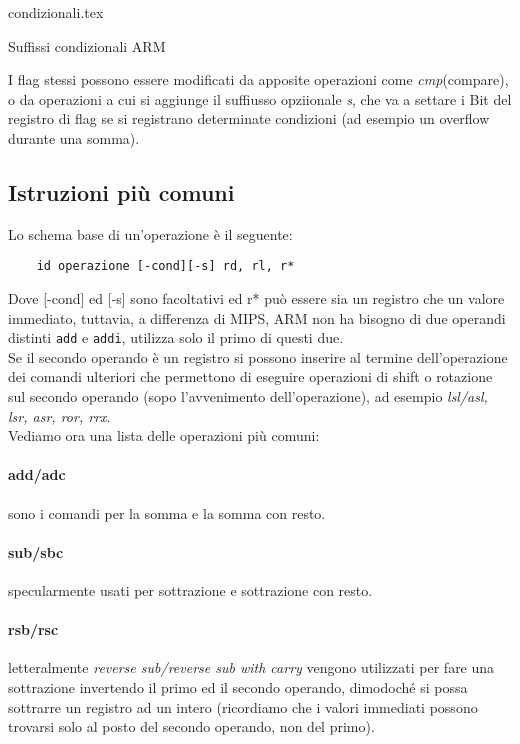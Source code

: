 \documentclass[class=book, crop=false]{standalone}
\begin{document}
\begin{table}[H]
	\centering
	{condizionali.tex}
	\caption*{Suffissi condizionali ARM}
\end{table}

I flag stessi possono essere modificati da apposite operazioni come \emph{cmp}(compare), o da operazioni a cui si aggiunge il suffiusso opziionale \emph{s}, che va a settare i Bit del registro di flag se si registrano determinate condizioni (ad esempio un overflow durante una somma).\\

\subsection*{Istruzioni più comuni}
Lo schema base di un'operazione è il seguente:

\begin{verbatim}
	id operazione [-cond][-s] rd, rl, r*
\end{verbatim}

Dove [-cond] ed [-s] sono facoltativi ed r* può essere sia un registro che un valore immediato, tuttavia, a differenza di MIPS, ARM non ha bisogno di due operandi distinti \texttt{add} e \texttt{addi}, utilizza solo il primo di questi due.\\
Se il secondo operando è un registro si possono inserire al termine dell'operazione dei comandi ulteriori che permettono di eseguire operazioni di shift o rotazione sul secondo operando (sopo l'avvenimento dell'operazione), ad esempio \emph{lsl/asl, lsr, asr, ror, rrx}.\\
Vediamo ora una lista delle operazioni più comuni:
\paragraph*{add/adc} sono i comandi per la somma e la somma con resto.
\paragraph{sub/sbc} specularmente usati per sottrazione e sottrazione con resto.
\paragraph*{rsb/rsc} letteralmente \emph{reverse sub/reverse sub with carry} vengono utilizzati per fare una sottrazione invertendo il primo ed il secondo operando, dimodoché si possa sottrarre un registro ad un intero (ricordiamo che i valori immediati possono trovarsi solo al posto del secondo operando, non del primo).
\end{document}

